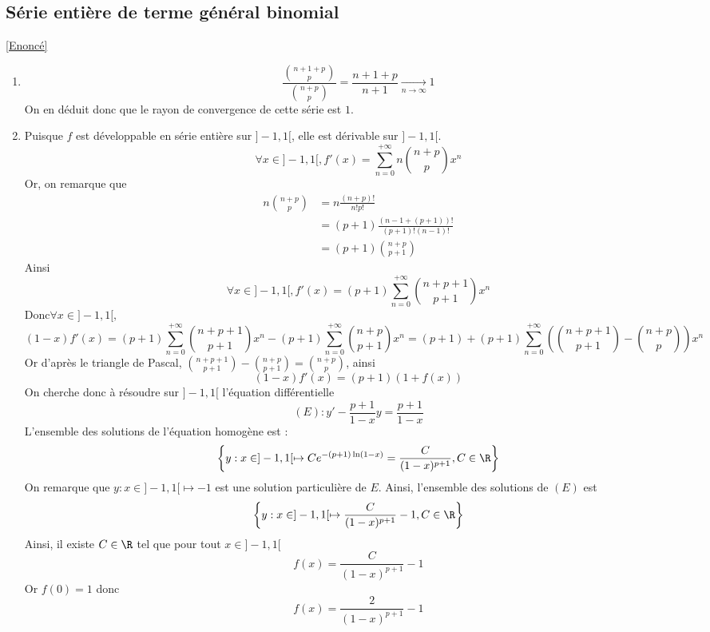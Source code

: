 \documentclass{book}
\begin{document}
	\subsection{Série entière de terme général binomial}\label{sec:serie-entiere-de-terme-general-binomial}
	\textcolor{blue}{\hyperref[Série entière de terme général binomial]{[Enoncé]}}\\
	\begin{enumerate}
		\item \[\frac{\binom{n+1+p}{p}}{\binom{n+p}{p}}=\frac{n+1+p}{n+1}\underset{n\to\infty}{\longrightarrow}1\]
		On en déduit donc que le rayon de convergence de cette série est $1$.
		\item Puisque $f$ est développable en série entière sur $]-1,1[$, elle est dérivable sur $]-1,1[$.\\
		\[\forall x\in]-1,1[, f'(x)=\sum_{n=0}^{+\infty}n\binom{n+p}{p}x^n\]
		Or, on remarque que \begin{align*}
			n\binom{n+p}{p}&=n\frac{(n+p)!}{n!p!}\\
			&=(p+1)\frac{(n-1+(p+1))!}{(p+1)!(n-1)!}\\
			&=(p+1)\binom{n+p}{p+1}
		\end{align*}
		Ainsi \[\forall x\in]-1,1[, f'(x)=(p+1)\sum_{n=0}^{+\infty}\binom{n+p+1}{p+1}x^n\]
		Donc$\forall x\in]-1,1[,$ \[ (1-x)f'(x)=(p+1)\sum_{n=0}^{+\infty}\binom{n+p+1}{p+1}x^n-(p+1)\sum_{n=0}^{+\infty}\binom{n+p}{p+1}x^n=(p+1)+(p+1)\sum_{n=0}^{+\infty}\left(\binom{n+p+1}{p+1}-\binom{n+p}{p}\right)x^n\]
		Or d'après le triangle de Pascal, $\displaystyle\binom{n+p+1}{p+1}-\binom{n+p}{p+1}=\binom{n+p}{p}$, ainsi 
		\[(1-x)f'(x)=(p+1)(1+f(x))\]
		On cherche donc à résoudre sur $]-1,1[$ l'équation différentielle 
		\[(E):y'-\frac{p+1}{1-x}y=\frac{p+1}{1-x}\]
		L'ensemble des solutions de l'équation homogène est :
		\[\left\{y:x\in]-1,1[\mapsto Ce^{-(p+1)\ln(1-x)}=\frac{C}{(1-x)^{p+1}},C\in\R\right\}\]
		On remarque que $y:x\in]-1,1[\mapsto -1$ est une solution particulière de $E$.
		Ainsi, l'ensemble des solutions de $(E)$ est 
		\[\left\{y:x\in]-1,1[\mapsto \frac{C}{(1-x)^{p+1}}-1,C\in\R\right\}\]
		Ainsi, il existe $C\in\R$ tel que pour tout $x\in]-1,1[$ \[f(x)=\frac{C}{(1-x)^{p+1}}-1\]
		Or $f(0)=1$ donc \[f(x)=\frac{2}{(1-x)^{p+1}}-1\]
	\end{enumerate}
\end{document}
